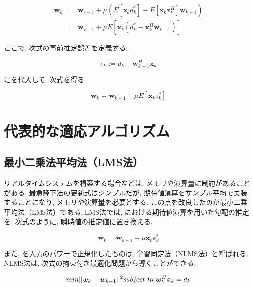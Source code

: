 \begin{equation}
\begin{split}
\bm{w}_k &= \bm{w}_{k-1} + \mu (E[\bm{x}_k d_k^*] - E[\bm{x}_k \bm{x}_k^H] \bm{w}_{k-1}) \\
         &= \bm{w}_{k-1} + \mu E[\bm{x}_k (d_k^* - \bm{x}_k^H \bm{w}_{k-1})]
\end{split}
\label{equ:w_complex}
\end{equation}

ここで, 次式の事前推定誤差を定義する. 

\begin{equation}
e_k := d_k - \bm{w}_{k-1}^H \bm{x}_k
\label{equ:prior_estimation_error}
\end{equation}

にを代入して, 次式を得る. 

\begin{equation}
\bm{w}_k = \bm{w}_{k-1} + \mu E[\bm{x}_k e_k^*]
\label{equ:w_update_sd}
\end{equation}


\section{代表的な適応アルゴリズム}\label{main-algo}

\subsection{最小二乗法平均法（LMS法）}\label{lms}

リアルタイムシステムを構築する場合などは, メモリや演算量に制約があることがある. 最急降下法の更新式はシンプルだが, 期待値演算をサンプル平均で実装することになり, メモリや演算量を必要とする. この点を改良したのが最小二乗平均法（LMS法）である. LMS法では, における期待値演算を用いた勾配の推定を, 次式のように, 瞬時値の推定値に置き換える. 

\begin{equation}
\bm{w}_k = \bm{w}_{k-1} + \mu \bm{x}_k e_k^*
\label{equ:w_update_lms_simple}
\end{equation}

また, を入力のパワーで正規化したものは, 学習同定法（NLMS法）と呼ばれる. NLMS法は, 次式の拘束付き最適化問題から導くことができる. 

\begin{equation}
min ||\bm{w}_k - \bm{w}_{k-1}||^2 \\
subject \ to \ \bm{w}_k^H \bm{x}_k = d_k
\end{equation}

